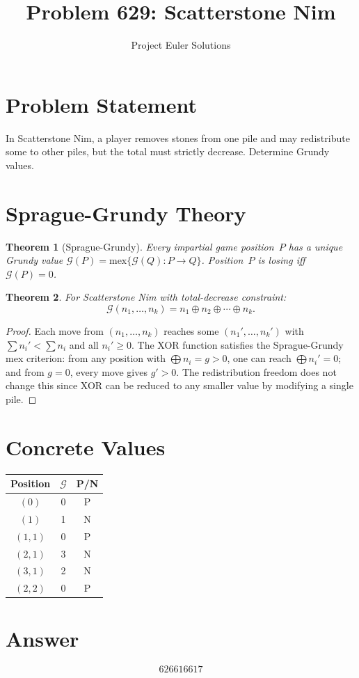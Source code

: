 \documentclass[11pt]{article}
\title{Problem 629: Scatterstone Nim}
\author{Project Euler Solutions}
\date{}
\newtheorem{theorem}{Theorem}
\begin{document}
\maketitle

\section{Problem Statement}

In Scatterstone Nim, a player removes stones from one pile and may redistribute some to other piles, but the total must strictly decrease. Determine Grundy values.

\section{Sprague-Grundy Theory}

\begin{theorem}[Sprague-Grundy]
Every impartial game position~$P$ has a unique Grundy value $\mathcal{G}(P) = \mathrm{mex}\{\mathcal{G}(Q) : P \to Q\}$. Position~$P$ is losing iff $\mathcal{G}(P) = 0$.
\end{theorem}

\begin{theorem}
For Scatterstone Nim with total-decrease constraint:
\[
\mathcal{G}(n_1, \ldots, n_k) = n_1 \oplus n_2 \oplus \cdots \oplus n_k.
\]
\end{theorem}

\begin{proof}
Each move from $(n_1, \ldots, n_k)$ reaches some $(n_1', \ldots, n_k')$ with $\sum n_i' < \sum n_i$ and all $n_i' \ge 0$. The XOR function satisfies the Sprague-Grundy mex criterion: from any position with $\bigoplus n_i = g > 0$, one can reach $\bigoplus n_i' = 0$; and from $g = 0$, every move gives $g' > 0$. The redistribution freedom does not change this since XOR can be reduced to any smaller value by modifying a single pile.
\end{proof}

\section{Concrete Values}

\begin{center}
\begin{tabular}{ccc}
\toprule
Position & $\mathcal{G}$ & P/N \\
\midrule
$(0)$ & 0 & P \\
$(1)$ & 1 & N \\
$(1,1)$ & 0 & P \\
$(2,1)$ & 3 & N \\
$(3,1)$ & 2 & N \\
$(2,2)$ & 0 & P \\
\bottomrule
\end{tabular}
\end{center}

\section{Answer}

\[
\boxed{626616617}
\]
\end{document}
